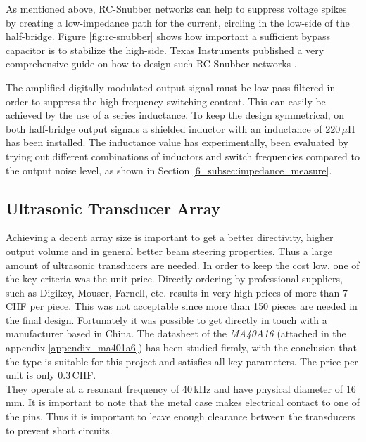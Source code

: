 As mentioned above, RC-Snubber networks can help to suppress voltage spikes by creating a low-impedance path for the current, circling in the low-side of the half-bridge. Figure \ref{fig:rc-snubber} shows how important a sufficient bypass capacitor is to stabilize the high-side. Texas Instruments published a very comprehensive guide on how to design such RC-Snubber networks \cite{ti_class_d_snubber_design}.

The amplified digitally modulated output signal must be low-pass filtered in order to suppress the high frequency switching content. This can easily be achieved by the use of a series inductance. To keep the design symmetrical, on both half-bridge output signals a shielded inductor with an inductance of 220\,$\mu$H has been installed. The inductance value has experimentally, been evaluated by trying out different combinations of inductors and switch frequencies compared to the output noise level, as shown in Section \ref{6_subsec:impedance_measure}.

\subsection{Ultrasonic Transducer Array}
Achieving a decent array size is important to get a better directivity, higher output volume and in general better beam steering properties. Thus a large amount of ultrasonic transducers are needed. In order to keep the cost low, one of the key criteria was the unit price. Directly ordering by professional suppliers, such as Digikey, Mouser, Farnell, etc. results in very high prices of more than 7\,CHF per piece. This was not acceptable since more than 150 pieces are needed in the final design. Fortunately it was possible to get directly in touch with a manufacturer based in China. The datasheet of the \textit{MA40A16} (attached in the appendix \ref{appendix_ma401a6}) has been studied firmly, with the conclusion that the type is suitable for this project and satisfies all key parameters. The price per unit is only 0.3\,CHF.\\
They operate at a resonant frequency of 40\,kHz and have physical diameter of 16\,mm. It is important to note that the metal case makes electrical contact to one of the pins. Thus it is important to leave enough clearance between the transducers to prevent short circuits.

